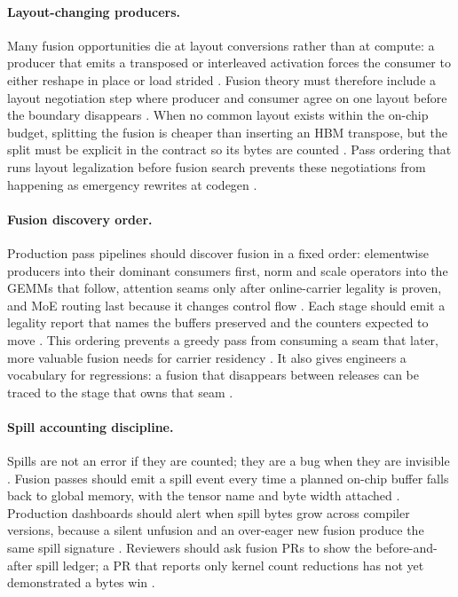 \paragraph{Layout-changing producers.}
Many fusion opportunities die at layout conversions rather than at compute: a producer that emits a transposed or interleaved activation forces the consumer to either reshape in place or load strided \citep{semianalysis2024tma,dlbook,patel2025llminference}. Fusion theory must therefore include a layout negotiation step where producer and consumer agree on one layout before the boundary disappears \citep{chen2020compilerbasedhardw,yirage2026}. When no common layout exists within the on-chip budget, splitting the fusion is cheaper than inserting an HBM transpose, but the split must be explicit in the contract so its bytes are counted \citep{memoryfloor2026,taxbreak2026}. Pass ordering that runs layout legalization before fusion search prevents these negotiations from happening as emergency rewrites at codegen \citep{chen2020compilerbasedhardw,amd2024xdna}.

\paragraph{Fusion discovery order.}
Production pass pipelines should discover fusion in a fixed order: elementwise producers into their dominant consumers first, norm and scale operators into the GEMMs that follow, attention seams only after online-carrier legality is proven, and MoE routing last because it changes control flow \citep{dao2022flashattention,liu2024deepseekv3,chen2020compilerbasedhardw}. Each stage should emit a legality report that names the buffers preserved and the counters expected to move \citep{yirage2026,taxbreak2026,memoryfloor2026}. This ordering prevents a greedy pass from consuming a seam that later, more valuable fusion needs for carrier residency \citep{dao2022flashattention,patel2025llminference}. It also gives engineers a vocabulary for regressions: a fusion that disappears between releases can be traced to the stage that owns that seam \citep{yirage2026,chen2020compilerbasedhardw}.

\paragraph{Spill accounting discipline.}
Spills are not an error if they are counted; they are a bug when they are invisible \citep{memoryfloor2026,taxbreak2026,patel2025llminference}. Fusion passes should emit a spill event every time a planned on-chip buffer falls back to global memory, with the tensor name and byte width attached \citep{yirage2026,chen2020compilerbasedhardw}. Production dashboards should alert when spill bytes grow across compiler versions, because a silent unfusion and an over-eager new fusion produce the same spill signature \citep{memoryfloor2026,taxbreak2026}. Reviewers should ask fusion PRs to show the before-and-after spill ledger; a PR that reports only kernel count reductions has not yet demonstrated a bytes win \citep{patel2025llminference,semianalysis2024tma}.

